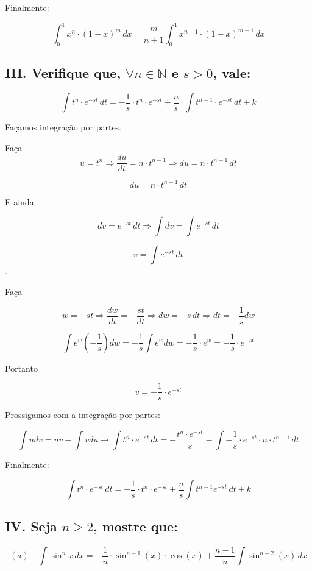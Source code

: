 \documentclass{article}
\begin{document}
Finalmente:

\begin{equation*}
    \int_0^1 x^n \cdot (1-x)^m \, dx = \dfrac{m}{n+1} \int_0^1 x^{n+1} \cdot (1-x)^{m-1} \, dx
\end{equation*}

\subsection*{III. Verifique que, \( \forall n \in \mathbb{N}\) e \(s > 0\), vale:}
\[
    \int t^n \cdot e^{-st} \, dt
    =
    -\dfrac{1}{s} \cdot t^n \cdot e^{-st}
    + \dfrac{n}{s} \cdot \int t^{n-1} \cdot e^{-st} \, dt
    + k
\]

Façamos integração por partes.

Faça
\[
    u = t^n \Rightarrow \dfrac{du}{dt} = n \cdot t^{n-1} \Rightarrow du = n \cdot t^{n-1} \, dt
\]

\[
    du = n \cdot t^{n-1} \, dt
\]

E ainda

\[
    dv = e^{-st} \, dt \Rightarrow \int dv = \int e^{-st} \, dt
\]

\[
    v =   \int e^{-st} \, dt
\].

Faça

\[
    w = -st \Rightarrow \dfrac{dw}{dt} = -\dfrac{st}{dt} \Rightarrow dw = -s \, dt
    \Rightarrow dt = -\dfrac{1}{s} dw
\]

\[
    \int e^{w} (-\dfrac{1}{s})dw
    = -\dfrac{1}{s} \int e^{w} dw
    = -\dfrac{1}{s} \cdot e^{w}
    = -\dfrac{1}{s} \cdot e^{-st}
\]

Portanto

\[
    v = - \dfrac{1}{s} \cdot e^{-st}
\]

Prossigamos com a integração por partes:

\[
    \int udv = uv - \int vdu \rightarrow \int t^n \cdot e^{-st} \, dt
    = - \dfrac{t^n \cdot e^{-st}}{s} - \int - \dfrac{1}{s} \cdot e^{-st} \cdot n \cdot t^{n-1} \, dt
\]

Finalmente:

\[
    \int t^n \cdot e^{-st} \, dt
    = - \dfrac{1}{s} \cdot t^n \cdot e^{-st} + \dfrac{n}{s} \int  t^{n-1} e^{-st}  \, dt
    + k
\]

\subsection*{IV. Seja \(n \ge 2\), mostre que:}

\[
    (a) \quad \int \sin^nx \, dx
    = -\dfrac{1}{n} \cdot \sin^{n-1}(x) \cdot \cos(x)
    + \dfrac{n-1}{n} \int \sin^{n-2}(x) \, dx
\]
\end{document}
